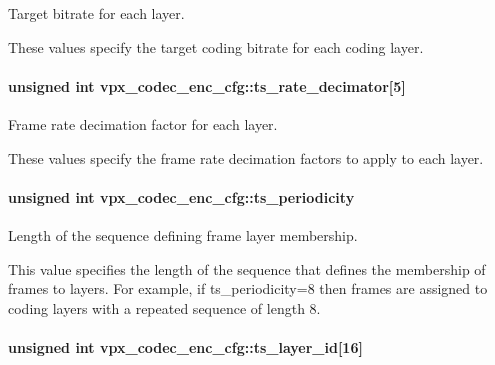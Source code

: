 \-Target bitrate for each layer. 

\-These values specify the target coding bitrate for each coding layer. \hypertarget{structvpx__codec__enc__cfg_ad40c30846ef8ef1d8684f10a491ec535}{
\paragraph[{ts\-\_\-rate\-\_\-decimator}]{\setlength{\rightskip}{0pt plus 5cm}unsigned int {\bf vpx\-\_\-codec\-\_\-enc\-\_\-cfg\-::ts\-\_\-rate\-\_\-decimator}\mbox{[}5\mbox{]}}}
\label{structvpx__codec__enc__cfg_ad40c30846ef8ef1d8684f10a491ec535}


\-Frame rate decimation factor for each layer. 

\-These values specify the frame rate decimation factors to apply to each layer. \hypertarget{structvpx__codec__enc__cfg_a4ec338780115dd270acf0dac24193474}{
\paragraph[{ts\-\_\-periodicity}]{\setlength{\rightskip}{0pt plus 5cm}unsigned int {\bf vpx\-\_\-codec\-\_\-enc\-\_\-cfg\-::ts\-\_\-periodicity}}}
\label{structvpx__codec__enc__cfg_a4ec338780115dd270acf0dac24193474}


\-Length of the sequence defining frame layer membership. 

\-This value specifies the length of the sequence that defines the membership of frames to layers. \-For example, if ts\-\_\-periodicity=8 then frames are assigned to coding layers with a repeated sequence of length 8. \hypertarget{structvpx__codec__enc__cfg_a4d105d2470dbfb7210b33d298f1cf1f6}{
\paragraph[{ts\-\_\-layer\-\_\-id}]{\setlength{\rightskip}{0pt plus 5cm}unsigned int {\bf vpx\-\_\-codec\-\_\-enc\-\_\-cfg\-::ts\-\_\-layer\-\_\-id}\mbox{[}16\mbox{]}}}
\label{structvpx__codec__enc__cfg_a4d105d2470dbfb7210b33d298f1cf1f6}


